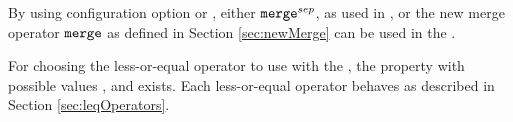 By using configuration option  or , either $\texttt{merge}^{sep}$, as used in \cite{Lemberger2015}, or the new merge operator $\texttt{merge}$ as defined in Section \ref{sec:newMerge} can be used in the \constraintsCPA.

For choosing the less-or-equal operator to use with the \constraintsCPA, the property 
with possible values ,  and  exists.
Each less-or-equal operator behaves as described in Section \ref{sec:leqOperators}.
